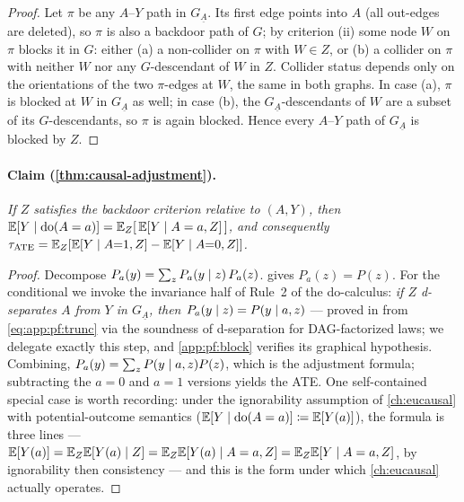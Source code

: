 \begin{proof}
Let $\pi$ be any $A$--$Y$ path in $G_{\underline{A}}$. Its first edge points into $A$ (all out-edges
are deleted), so $\pi$ is also a backdoor path of $G$; by criterion (ii) some node $W$ on $\pi$ blocks
it in $G$: either (a) a non-collider on $\pi$ with $W \in Z$, or (b) a collider on $\pi$ with neither
$W$ nor any $G$-descendant of $W$ in $Z$. Collider status depends only on the orientations of the two
$\pi$-edges at $W$, the same in both graphs. In case (a), $\pi$ is blocked at $W$ in
$G_{\underline{A}}$ as well; in case (b), the $G_{\underline{A}}$-descendants of $W$ are a subset of
its $G$-descendants, so $\pi$ is again blocked. Hence every $A$--$Y$ path of $G_{\underline{A}}$ is
blocked by $Z$.
\end{proof}
\paragraph{Claim (\cref{thm:causal-adjustment}).}
\emph{If $Z$ satisfies the backdoor criterion relative to $(A, Y)$, then $\mathbb{E}[Y \mid \mathrm{do}(A=a)] =
\mathbb{E}_Z[\, \mathbb{E}[Y \mid A=a, Z] \,]$, and consequently $\tau_{\mathrm{ATE}} = \mathbb{E}_Z[\mathbb{E}[Y \mid A{=}1, Z] -
\mathbb{E}[Y \mid A{=}0, Z]]$.}
\begin{proof}
Decompose $P_a(y) = \sum_z P_a(y \mid z)\, P_a(z)$.  gives $P_a(z) = P(z)$. For
the conditional we invoke the invariance half of Rule~2 of the do-calculus: \emph{if $Z$ d-separates
$A$ from $Y$ in $G_{\underline{A}}$, then $P_a(y \mid z) = P(y \mid a, z)$} --- proved in
\citet{pearl1995} from \cref{eq:app:pf:trunc} via the soundness of d-separation for DAG-factorized
laws; we delegate exactly this step, and \cref{app:pf:block} verifies its graphical hypothesis.
Combining, $P_a(y) = \sum_z P(y \mid a, z) P(z)$, which is the adjustment formula; subtracting the
$a = 0$ and $a = 1$ versions yields the ATE. One self-contained special case is worth recording: under
the ignorability assumption of \cref{ch:eucausal} with potential-outcome semantics ($\mathbb{E}[Y \mid
\mathrm{do}(A=a)] \coloneqq \mathbb{E}[Y(a)]$), the formula is three lines --- $\mathbb{E}[Y(a)] = \mathbb{E}_Z\mathbb{E}[Y(a) \mid Z] =
\mathbb{E}_Z\mathbb{E}[Y(a) \mid A=a, Z] = \mathbb{E}_Z\mathbb{E}[Y \mid A=a, Z]$, by ignorability then consistency --- and this is the
form under which \cref{ch:eucausal} actually operates.
\end{proof}

